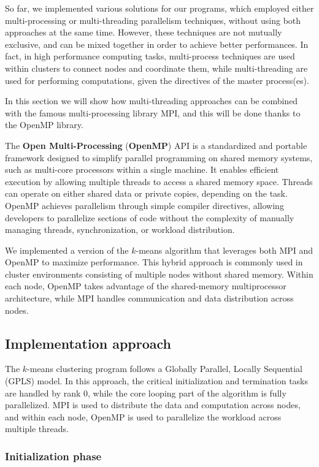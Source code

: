 \documentclass[11pt, journal]{IEEEtran}
\newcommand{\nwl}{

\vspace{11pt}

}
\begin{document}
So far, we implemented various solutions for our programs, which employed either multi-processing or multi-threading parallelism techniques, without using both approaches at the same time. However, these techniques are not mutually exclusive, and can be mixed together in order to achieve better performances. In fact, in high performance computing tasks, multi-process techniques are used within clusters to connect nodes and coordinate them, while multi-threading are used for performing computations, given the directives of the master process(es).
\nwl
In this section we will show how multi-threading approaches can be combined with the famous multi-processing library MPI, and this will be done thanks to the OpenMP library.
\nwl
The \textbf{Open Multi-Processing} (\textbf{OpenMP}) API is a standardized and portable framework designed to simplify parallel programming on shared memory systems, such as multi-core processors within a single machine. It enables efficient execution by allowing multiple threads to access a shared memory space. Threads can operate on either shared data or private copies, depending on the task. OpenMP achieves parallelism through simple compiler directives, allowing developers to parallelize sections of code without the complexity of manually managing threads, synchronization, or workload distribution.
\nwl
We implemented a version of the $k$-means algorithm that leverages both MPI and OpenMP to maximize performance. This hybrid approach is commonly used in cluster environments consisting of multiple nodes without shared memory. Within each node, OpenMP takes advantage of the shared-memory multiprocessor architecture, while MPI handles communication and data distribution across nodes.

\subsection{Implementation approach}

The $k$-means clustering program follows a Globally Parallel, Locally Sequential (GPLS) model. In this approach, the critical initialization and termination tasks are handled by rank 0, while the core looping part of the algorithm is fully parallelized. MPI is used to distribute the data and computation across nodes, and within each node, OpenMP is used to parallelize the workload across multiple threads.
\nwl
\subsubsection{Initialization phase}
\end{document}

